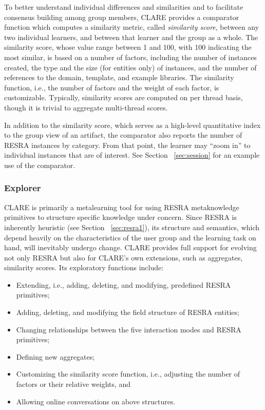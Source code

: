To better understand individual differences and similarities and to
facilitate consensus building among group members, CLARE provides a
comparator function which computes a similarity metric, called {\it
similarity score\/}, between any two individual learners, and between that
learner and the group as a whole. The similarity score, whose value range
between 1 and 100, with 100 indicating the most similar, is based on a
number of factors, including the number of instances created, the type and
the size (for entities only) of instances, and the number of references to
the domain, template, and example libraries. The similarity function, i.e.,
the number of factors and the weight of each factor, is customizable.
Typically, similarity scores are computed on per thread basis, though it is
trivial to aggregate multi-thread scores.

In addition to the similarity score, which serves as a high-level
quantitative index to the group view of an artifact, the comparator
also reports the number of RESRA instances by category. From that point,
the learner may ``zoom in'' to individual instances that are of interest.
See Section ~\ref{sec:session} for an example use of the comparator.


\subsubsection{Explorer}
\label{sec:explorer}

CLARE is primarily a metalearning tool for using RESRA metaknowledge
primitives to structure specific knowledge under concern.  Since RESRA is
inherently heuristic (see Section ~\ref{sec:resra1}), its structure and
semantics, which depend heavily on the characteristics of the user group
and the learning task on hand, will inevitably undergo change.  CLARE
provides full support for evolving not only RESRA but also for CLARE's own
extensions, such as aggregates, similarity scores. Its exploratory
functions include:

\begin{itemize}
\item Extending, i.e., adding, deleting, and modifying, predefined RESRA
  primitives;
  
\item Adding, deleting, and modifying the field structure of RESRA
  entities;
  
\item Changing relationships between the five interaction modes and RESRA
  primitives;
  
\item Defining new aggregates;
  
\item Customizing the similarity score function, i.e., adjusting the number
  of factors or their relative weights, and
  
\item Allowing online conversations on above structures.
\end{itemize}

